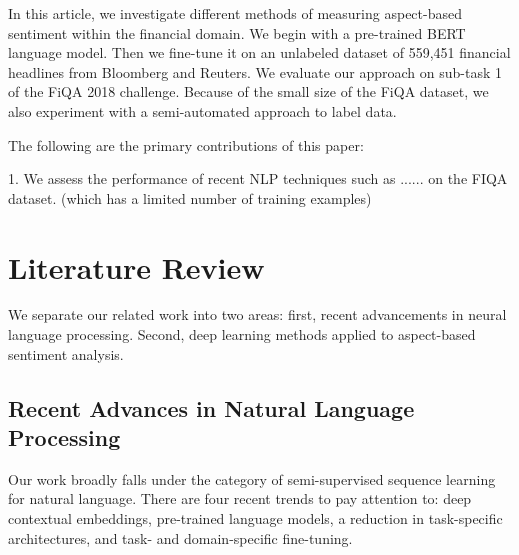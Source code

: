 







In this article, we investigate different methods of measuring aspect-based sentiment within the financial domain.  We begin with a pre-trained BERT language model. Then we fine-tune it on an unlabeled dataset of 559,451 financial headlines from Bloomberg and Reuters. We evaluate our approach on sub-task 1 of the FiQA 2018 challenge. Because of the small size of the FiQA dataset, we also experiment with a semi-automated approach to label data.




The following are the primary contributions of this paper:

1. We assess the performance of recent NLP techniques such as ...... on the FIQA dataset. (which has a limited number of training examples)


\section{Literature Review}

We separate our related work into two areas: first, recent advancements in neural language processing. Second, deep learning methods applied to aspect-based sentiment analysis.

\subsection{Recent Advances in Natural Language Processing}




Our work broadly falls under the category of semi-supervised sequence learning for natural language. There are four recent trends to pay attention to: deep contextual embeddings, pre-trained language models, a reduction in task-specific architectures, and task- and domain-specific fine-tuning.

